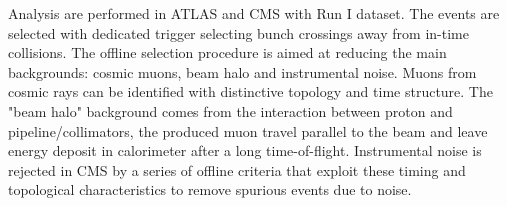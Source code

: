 Analysis are performed in ATLAS and CMS with Run I dataset. The events are selected with dedicated trigger selecting bunch crossings away from in-time collisions. The offline selection procedure is aimed at reducing the main backgrounds: cosmic muons, beam halo and instrumental noise. Muons from cosmic rays can be identified with distinctive topology and time structure. The "beam halo" background comes from the interaction between proton and pipeline/collimators, the produced muon travel parallel to the beam and leave energy deposit in calorimeter after a long time-of-flight. Instrumental noise is rejected in CMS by a series of offline criteria that exploit these timing and topological characteristics to remove spurious events due to noise.

